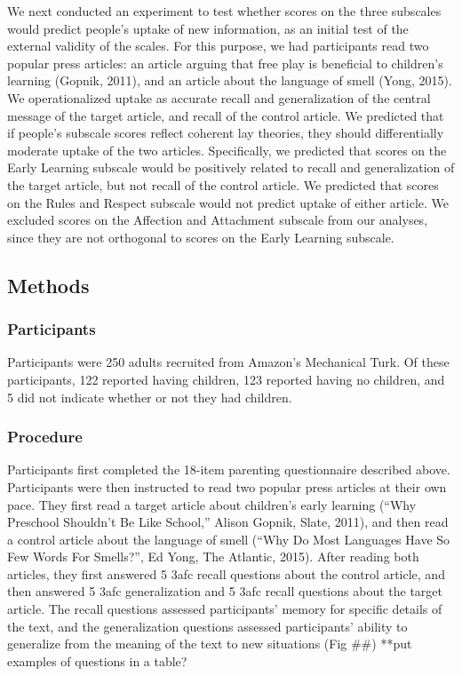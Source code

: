 \documentclass[10pt, letterpaper]{article}
\begin{document}
We next conducted an experiment to test whether scores on the three
subscales would predict people's uptake of new information, as an
initial test of the external validity of the scales. For this purpose,
we had participants read two popular press articles: an article arguing
that free play is beneficial to children's learning (Gopnik, 2011), and
an article about the language of smell (Yong, 2015). We operationalized
uptake as accurate recall and generalization of the central message of
the target article, and recall of the control article. We predicted that
if people's subscale scores reflect coherent lay theories, they should
differentially moderate uptake of the two articles. Specifically, we
predicted that scores on the Early Learning subscale would be positively
related to recall and generalization of the target article, but not
recall of the control article. We predicted that scores on the Rules and
Respect subscale would not predict uptake of either article. We excluded
scores on the Affection and Attachment subscale from our analyses, since
they are not orthogonal to scores on the Early Learning subscale.

\subsection{Methods}\label{methods}

\subsubsection{Participants}\label{participants}

Participants were 250 adults recruited from Amazon's Mechanical Turk. Of
these participants, 122 reported having children, 123 reported having no
children, and 5 did not indicate whether or not they had children.

\subsubsection{Procedure}\label{procedure}

Participants first completed the 18-item parenting questionnaire
described above. Participants were then instructed to read two popular
press articles at their own pace. They first read a target article about
children's early learning (``Why Preschool Shouldn't Be Like School,''
Alison Gopnik, Slate, 2011), and then read a control article about the
language of smell (``Why Do Most Languages Have So Few Words For
Smells?'', Ed Yong, The Atlantic, 2015). After reading both articles,
they first answered 5 3afc recall questions about the control article,
and then answered 5 3afc generalization and 5 3afc recall questions
about the target article. The recall questions assessed participants'
memory for specific details of the text, and the generalization
questions assessed participants' ability to generalize from the meaning
of the text to new situations (Fig \#\#) **put examples of questions in
a table?
\end{document}
